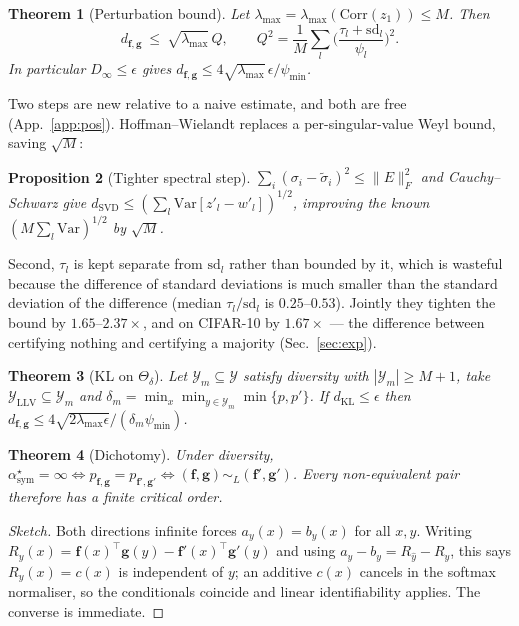 \documentclass[10pt,letterpaper,twocolumn]{article}
\newcommand{\Y}{\mathcal{Y}}
\newcommand{\bff}{\mathbf{f}}
\newcommand{\bfg}{\mathbf{g}}
\newcommand{\dKL}{d_{\mathrm{KL}}}
\newcommand{\dSVD}{d_{\mathrm{SVD}}}
\newcommand{\dfg}{d_{\bff,\bfg}}
\newcommand{\Dinf}{D_{\infty}}
\newcommand{\Var}{\mathrm{Var}}
\newcommand{\simL}{\sim_{L}}
\newcommand{\Thetadelta}{\Theta_{\delta}}
\theoremstyle{plain}
\newtheorem{theorem}{Theorem}
\newtheorem{proposition}[theorem]{Proposition}
\theoremstyle{definition}
\theoremstyle{remark}
\begin{document}
\begin{theorem}[Perturbation bound]
\label{thm:maxdiv}
Let $\lambda_{\max}=\lambda_{\max}(\mathrm{Corr}(z_{1}))\le M$. Then
\begin{equation}
\dfg\ \le\ \sqrt{\lambda_{\max}}\,Q,\qquad
Q^{2}=\frac1M\sum_{l}\Big(\frac{\tau_{l}+\mathrm{sd}_{l}}{\psi_{l}}\Big)^{2}.
\label{eq:maxdiv-bound}
\end{equation}
In particular $\Dinf\le\epsilon$ gives
$\dfg\le4\sqrt{\lambda_{\max}}\,\epsilon/\psi_{\min}$.
\end{theorem}

Two steps are new relative to a naive estimate, and both are free
(App.~\ref{app:pos}). Hoffman--Wielandt replaces a per-singular-value Weyl
bound, saving $\sqrt{M}$:
\begin{proposition}[Tighter spectral step]
\label{prop:tighten}
$\sum_{i}(\sigma_{i}-\tilde\sigma_{i})^{2}\le\|E\|_{F}^{2}$ and
Cauchy--Schwarz give
$\dSVD\le(\sum_{l}\Var[z'_{l}-w'_{l}])^{1/2}$, improving the known
$(M\sum_{l}\Var)^{1/2}$ by $\sqrt{M}$.
\end{proposition}
Second, $\tau_{l}$ is kept
separate from $\mathrm{sd}_{l}$ rather than bounded by it, which is wasteful
because the difference of standard deviations is much smaller than the standard
deviation of the difference (median $\tau_{l}/\mathrm{sd}_{l}$ is
$0.25$--$0.53$). Jointly they tighten the bound by $1.65$--$2.37\times$, and on
CIFAR-10 by $1.67\times$ --- the difference between certifying nothing and
certifying a majority (Sec.~\ref{sec:exp}).

\begin{theorem}[KL on $\Thetadelta$]
\label{thm:klcond}
Let $\Y_{m}\subseteq\Y$ satisfy diversity with $|\Y_{m}|\ge M+1$, take
$\mathcal{Y}_{\mathrm{LLV}}\subseteq\Y_{m}$ and
$\delta_{m}=\min_{x}\min_{y\in\Y_{m}}\min\{p,p'\}$. If $\dKL\le\epsilon$ then
$\dfg\le4\sqrt{2\lambda_{\max}\epsilon}/(\delta_{m}\psi_{\min})$.
\label{eq:klbound}
\end{theorem}

\begin{theorem}[Dichotomy]
\label{thm:dichotomy}
Under diversity,
$\alpha^{\star}_{\mathrm{sym}}=\infty\iff p_{\bff,\bfg}=p_{\bff',\bfg'}
\iff(\bff,\bfg)\simL(\bff',\bfg')$.
Every non-equivalent pair therefore has a \emph{finite} critical order.
\end{theorem}

\begin{proof}[Sketch]
Both directions infinite forces $a_{y}(x)=b_{y}(x)$ for all $x,y$. Writing
$R_{y}(x)=\bff(x)^{\top}\bfg(y)-\bff'(x)^{\top}\bfg'(y)$ and using
$a_{y}-b_{y}=R_{\hat y}-R_{y}$, this says $R_{y}(x)=c(x)$ is independent of
$y$; an additive $c(x)$ cancels in the softmax normaliser, so the conditionals
coincide and linear identifiability applies. The converse is immediate.
\end{proof}
\end{document}

